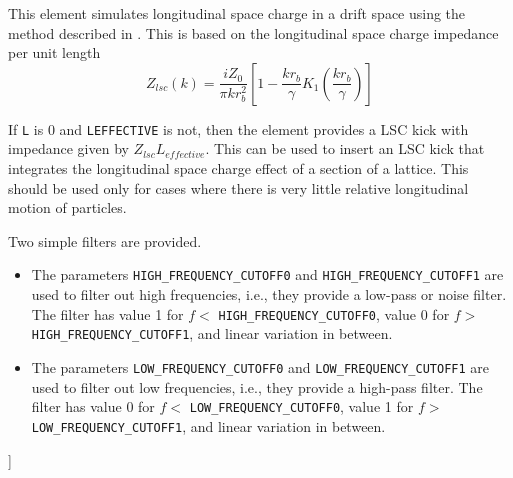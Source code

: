 This element simulates longitudinal space charge in a drift space using the
method described in \cite{Huang2004}.  This is based on the 
longitudinal space charge impedance per unit length
\begin{equation}
  Z_{lsc}(k) = \frac{i Z_0}{\pi k r_b^2} \left[ 1 - \frac{kr_b}{\gamma}K_1 \left(\frac{kr_b}{\gamma}\right)\right]
\end{equation}

If {\tt L} is 0 and {\tt LEFFECTIVE} is not, then the element provides a
LSC kick with impedance given by $Z_{lsc} L_{effective}$. This can be used
to insert an LSC kick that integrates the longitudinal space charge effect
of a section of a lattice.  This should be used only for cases 
where there is very little relative longitudinal motion of particles.

Two simple filters are provided.
\begin{itemize}
\item The parameters \verb|HIGH_FREQUENCY_CUTOFF0| and \verb|HIGH_FREQUENCY_CUTOFF1| are used to filter out high
  frequencies, i.e., they provide a low-pass or noise filter.  The filter has value 1 for $f<$ \verb|HIGH_FREQUENCY_CUTOFF0|,
  value 0 for $f>$ \verb|HIGH_FREQUENCY_CUTOFF1|, and linear variation in between.
\item The parameters \verb|LOW_FREQUENCY_CUTOFF0| and \verb|LOW_FREQUENCY_CUTOFF1| are used to filter out low
  frequencies, i.e., they provide a high-pass filter. The filter has value 0 for $f<$ \verb|LOW_FREQUENCY_CUTOFF0|, value 1 for
  $f>$ \verb|LOW_FREQUENCY_CUTOFF1|, and linear variation in between.
\end{itemize}
]
